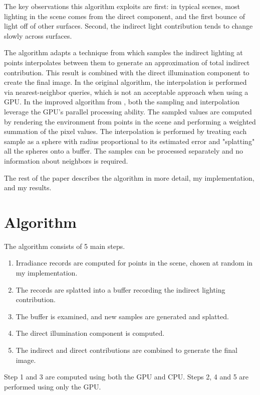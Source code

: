 \documentclass[10pt,twopage]{acmsiggraph}
\begin{document}
The key observations this algorithm exploits are first: in typical scenes, most lighting in the scene comes from the direct component, and the first bounce of light off of other surfaces.  Second, the indirect light contribution tends to change slowly across surfaces.  

The algorithm adapts a technique from \cite{ward1988ray} which samples the indirect lighting at points interpolates between them to generate an approximation of total indirect contribution.  This result is combined with the direct illumination component to create the final image.  In the original algorithm, the interpolation is performed via nearest-neighbor queries, which is not an acceptable approach when using a GPU.  In the improved algorithm from \cite{mainpaper}, both the sampling and interpolation leverage the GPU's parallel processing ability.  The sampled values are computed by rendering the environment from points in the scene and performing a weighted summation of the pixel values.  The interpolation is performed by treating each sample as a sphere with radius proportional to its estimated error and "splatting" all the spheres onto a buffer.  The samples can be processed separately and no information about neighbors is required.

The rest of the paper describes the algorithm in more detail, my implementation, and my results.

\section{Algorithm}
The algorithm consists of 5 main steps.  
\begin{enumerate}
\item Irradiance records are computed for points in the scene, chosen at random in my implementation.  
\item The records are splatted into a buffer recording the indirect lighting contribution.  
\item The buffer is examined, and new samples are generated and splatted.  
\item The direct illumination component is computed.  
\item The indirect and direct contributions are combined to generate the final image.  
\end{enumerate}

Step 1 and 3 are computed using both the GPU and CPU.  Steps 2, 4 and 5 are performed using only the GPU.
\end{document}
